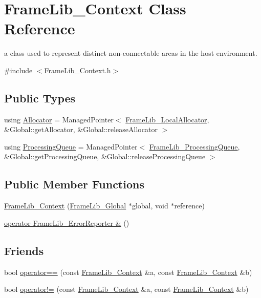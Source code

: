 \hypertarget{class_frame_lib___context}{}\section{Frame\+Lib\+\_\+\+Context Class Reference}
\label{class_frame_lib___context}


a class used to represent distinct non-\/connectable areas in the host environment.  




{\ttfamily \#include $<$Frame\+Lib\+\_\+\+Context.\+h$>$}

\subsection*{Public Types}
\begin{DoxyCompactItemize}
\item 
using \hyperlink{class_frame_lib___context_a5282f95b5825866bc4bb2aad500ccfa3}{Allocator} = Managed\+Pointer$<$ \hyperlink{class_frame_lib___local_allocator}{Frame\+Lib\+\_\+\+Local\+Allocator}, \&Global\+::get\+Allocator, \&Global\+::release\+Allocator $>$
\item 
using \hyperlink{class_frame_lib___context_aa1c7f3c910b75dbc827a140e5ad33d12}{Processing\+Queue} = Managed\+Pointer$<$ \hyperlink{class_frame_lib___processing_queue}{Frame\+Lib\+\_\+\+Processing\+Queue}, \&Global\+::get\+Processing\+Queue, \&Global\+::release\+Processing\+Queue $>$
\end{DoxyCompactItemize}
\subsection*{Public Member Functions}
\begin{DoxyCompactItemize}
\item 
\hyperlink{class_frame_lib___context_a2cfe1912e3e9d835de291277c8979ed8}{Frame\+Lib\+\_\+\+Context} (\hyperlink{class_frame_lib___global}{Frame\+Lib\+\_\+\+Global} $\ast$global, void $\ast$reference)
\item 
\hyperlink{class_frame_lib___context_a497e6bee6cea6f053ad04086bbc07e50}{operator Frame\+Lib\+\_\+\+Error\+Reporter \&} ()
\end{DoxyCompactItemize}
\subsection*{Friends}
\begin{DoxyCompactItemize}
\item 
bool \hyperlink{class_frame_lib___context_ab0382454ba28ee3ff302be24ffc861c0}{operator==} (const \hyperlink{class_frame_lib___context}{Frame\+Lib\+\_\+\+Context} \&a, const \hyperlink{class_frame_lib___context}{Frame\+Lib\+\_\+\+Context} \&b)
\item 
bool \hyperlink{class_frame_lib___context_a7aed82ce3d334858032a3c45e3c70169}{operator!=} (const \hyperlink{class_frame_lib___context}{Frame\+Lib\+\_\+\+Context} \&a, const \hyperlink{class_frame_lib___context}{Frame\+Lib\+\_\+\+Context} \&b)
\end{DoxyCompactItemize}


